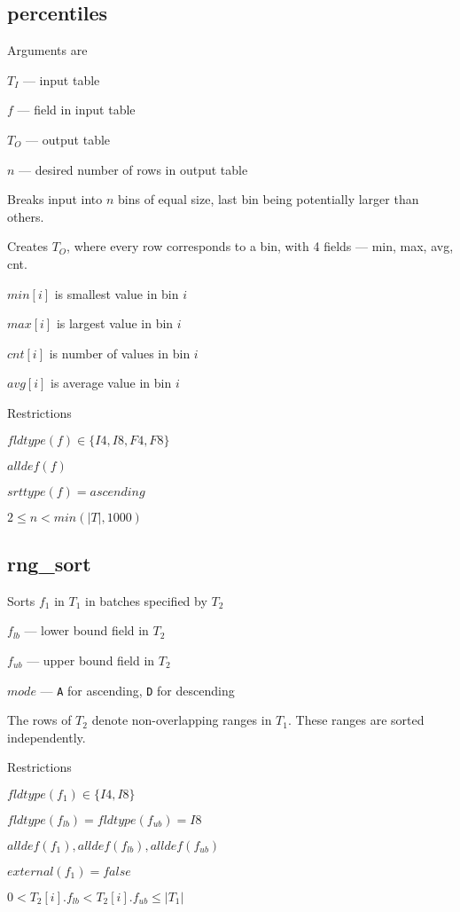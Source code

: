 \documentclass{report}
\begin{document}
\subsection{percentiles}
\label{percentiles}
Arguments are
\be
\item \(T_I\) --- input table
\item \(f\)   --- field in input table
\item \(T_O\) --- output table 
\item \(n\) --- desired number of rows in output table
\ee
\bi
\item Breaks input into \(n\) bins of equal size, last bin being potentially
larger than others. 
\item Creates \(T_O\), where every row corresponds to a bin, 
with 4 fields --- min, max, avg, cnt.
\be
\item \(min[i]\) is smallest value in bin \(i\)
\item \(max[i]\) is largest value in bin \(i\)
\item \(cnt[i]\) is number of values in bin \(i\)
\item \(avg[i]\) is average value in bin \(i\)
\ee
\ei


Restrictions
\be
\item \(fldtype(f) \in \{I4, I8, F4, F8\}\)
\item \(alldef(f)\)
\item \(srttype(f) = ascending\)
\item \(2 \leq n < min(|T|, 1000)\)
\ee

\subsection{rng\_sort}
\label{rng_sort}

Sorts \(f_1\) in \(T_1\) in batches specified by \(T_2\)
\be
\item \(f_{lb}\) --- lower bound field in \(T_2\) 
\item \(f_{ub}\) --- upper bound field in \(T_2\) 
\item \(mode\) --- {\tt A} for ascending, {\tt D} for descending
\ee

The rows of \(T_2\) denote non-overlapping ranges in \(T_1\). These
ranges are sorted independently.

Restrictions
\be
\item \(fldtype(f_1) \in \{I4, I8\}\)
\item \(fldtype(f_{lb})  = fldtype(f_{ub}) = I8\)
\item \(alldef(f_1), alldef(f_{lb}), alldef(f_{ub})\) 
\item \(external(f_1) = false\)
\item \(0 < T_2[i].f_{lb} < T_2[i].f_{ub} \leq |T_1|\)
\ee
\end{document}
